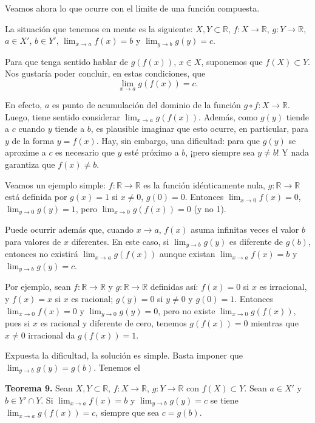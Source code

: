\documentclass[12pt,oneside]{book}
\begin{document}
Veamos ahora lo que ocurre con el límite de una función compuesta.

La situación que tenemos en mente es la siguiente: \(X, Y \subset \mathbb{R}\), \(f: X \to \mathbb{R}\), \(g: Y \to \mathbb{R}\), \(a \in X'\), \(b \in Y'\), \(\lim_{x \to a} f(x) = b\) y \(\lim_{y \to b} g(y) = c\).

Para que tenga sentido hablar de \(g(f(x))\), \(x \in X\), suponemos que \(f(X) \subset Y\). Nos gustaría poder concluir, en estas condiciones, que
\[\lim_{x \to a} g(f(x)) = c.\]

En efecto, \(a\) es punto de acumulación del dominio de la función \(g \circ f: X \to \mathbb{R}\). Luego, tiene sentido considerar \(\lim_{x \to a} g(f(x))\). Además, como \(g(y)\) tiende a \(c\) cuando \(y\) tiende a \(b\), es plausible imaginar que esto ocurre, en particular, para \(y\) de la forma \(y = f(x)\). Hay, sin embargo, una dificultad: para que \(g(y)\) se aproxime a \(c\) es necesario que \(y\) esté próximo a \(b\), ¡pero siempre sea \(y \neq b\)! Y nada garantiza que \(f(x) \neq b\).

Veamos un ejemplo simple: \(f: \mathbb{R} \to \mathbb{R}\) es la función idénticamente nula, \(g: \mathbb{R} \to \mathbb{R}\) está definida por \(g(x) = 1\) si \(x \neq 0\), \(g(0) = 0\). Entonces \(\lim_{x \to 0} f(x) = 0\), \(\lim_{y \to 0} g(y) = 1\), pero \(\lim_{x \to 0} g(f(x)) = 0\) (y no 1).

Puede ocurrir además que, cuando \(x \to a\), \(f(x)\) asuma infinitas veces el valor \(b\) para valores de \(x\) diferentes. En este caso, si \(\lim_{y \to b} g(y)\) es diferente de \(g(b)\), entonces no existirá \(\lim_{x \to a} g(f(x))\) aunque existan \(\lim_{x \to a} f(x) = b\) y \(\lim_{y \to b} g(y) = c\).

Por ejemplo, sean \(f: \mathbb{R} \to \mathbb{R}\) y \(g: \mathbb{R} \to \mathbb{R}\) definidas así: \(f(x) = 0\) si \(x\) es irracional, y \(f(x) = x\) si \(x\) es racional; \(g(y) = 0\) si \(y \neq 0\) y \(g(0) = 1\). Entonces \(\lim_{x \to 0} f(x) = 0\) y \(\lim_{y \to 0} g(y) = 0\), pero no existe \(\lim_{x \to 0} g(f(x))\), pues si \(x\) es racional y diferente de cero, tenemos \(g(f(x)) = 0\) mientras que \(x \neq 0\) irracional da \(g(f(x)) = 1\).

Expuesta la dificultad, la solución es simple. Basta imponer que \(\lim_{y \to b} g(y) = g(b)\). Tenemos el

\textbf{Teorema 9.} Sean \(X, Y \subset \mathbb{R}\), \(f: X \to \mathbb{R}\), \(g: Y \to \mathbb{R}\) con \(f(X) \subset Y\). Sean \(a \in X'\) y \(b \in Y' \cap Y\). Si \(\lim_{x \to a} f(x) = b\) y \(\lim_{y \to b} g(y) = c\) se tiene \(\lim_{x \to a} g(f(x)) = c\), siempre que sea \(c = g(b)\).
\end{document}
